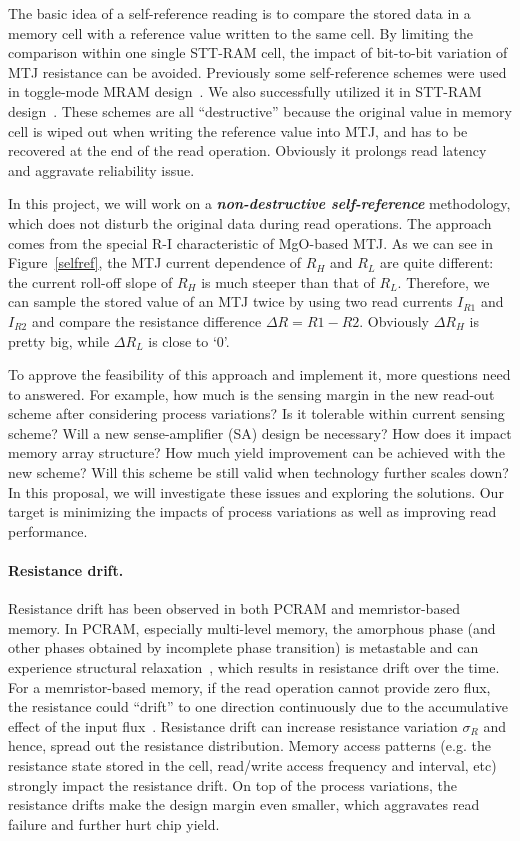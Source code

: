 The basic idea of a self-reference reading is to compare the stored data in a memory cell with a reference value written to the same cell. By limiting the comparison within one single STT-RAM cell, the impact of bit-to-bit variation of MTJ resistance can be avoided. Previously some self-reference schemes were used in toggle-mode MRAM design~\cite{MRAM:TTO+06,Jeong03}. We also successfully utilized it in STT-RAM design~\cite{Li:147723}. These schemes are all ``destructive'' because the original value in memory cell is wiped out when writing the reference value into MTJ, and has to be recovered at the end of the read operation. Obviously it prolongs read latency and aggravate reliability issue.

In this project, we will work on a \textbf{\textit{non-destructive self-reference}} methodology, which does not disturb the original data during read operations. The approach comes from the special R-I characteristic of MgO-based MTJ. As we can see in Figure~\ref{selfref}, the MTJ current dependence of $R_H$ and $R_L$ are quite different: the current roll-off slope of $R_H$ is much steeper than that of $R_L$. Therefore, we can sample the stored value of an MTJ twice by using two read currents $I_{R1}$ and $I_{R2}$ and compare the resistance difference ${\Delta}R=R1-R2$. Obviously ${\Delta}R_H$ is pretty big, while ${\Delta}R_L$ is close to `0'.

To approve the feasibility of this approach and implement it, more questions need to answered. For example, how much is the sensing margin in the new read-out scheme after considering process variations? Is it tolerable within current sensing scheme? Will a new sense-amplifier (SA) design be necessary? How does it impact memory array structure? How much yield improvement can be achieved with the new scheme? Will this scheme be still valid when technology further scales down? In this proposal, we will investigate these issues and exploring the solutions. Our target is minimizing the impacts of process variations as well as improving read performance.

\paragraph{Resistance drift.} Resistance drift has been observed in both PCRAM and memristor-based memory. In PCRAM, especially multi-level memory, the amorphous phase (and other phases obtained by incomplete phase transition) is metastable and can experience structural relaxation~\cite{Pirovano04}, which results in resistance drift over the time. For a memristor-based memory, if the read operation cannot provide zero flux, the resistance could ``drift'' to one direction continuously due to the accumulative effect of the input flux~\cite{Ho09}. Resistance drift can increase resistance variation $\sigma_R$ and hence, spread out the resistance distribution. Memory access patterns (e.g. the resistance state stored in the cell, read/write access frequency and interval, etc) strongly impact the resistance drift. On top of the process variations, the resistance drifts make the design margin even smaller, which aggravates read failure and further hurt chip yield.

